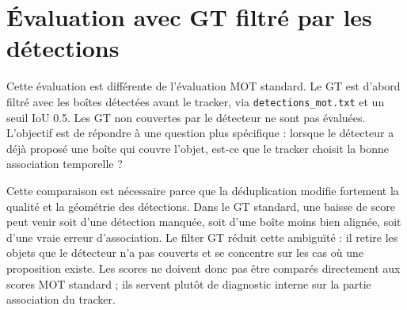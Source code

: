 \documentclass[11pt,a4paper]{article}
\begin{document}
\section{Évaluation avec GT filtré par les détections}

Cette évaluation est différente de l'évaluation MOT standard. Le GT est d'abord filtré avec les boîtes détectées avant le tracker, via \texttt{detections\_mot.txt} et un seuil IoU 0.5. Les GT non couvertes par le détecteur ne sont pas évaluées. L'objectif est de répondre à une question plus spécifique : lorsque le détecteur a déjà proposé une boîte qui couvre l'objet, est-ce que le tracker choisit la bonne association temporelle ?

Cette comparaison est nécessaire parce que la déduplication modifie fortement la qualité et la géométrie des détections. Dans le GT standard, une baisse de score peut venir soit d'une détection manquée, soit d'une boîte moins bien alignée, soit d'une vraie erreur d'association. Le filter GT réduit cette ambiguïté : il retire les objets que le détecteur n'a pas couverts et se concentre sur les cas où une proposition existe. Les scores ne doivent donc pas être comparés directement aux scores MOT standard ; ils servent plutôt de diagnostic interne sur la partie association du tracker.
\end{document}
